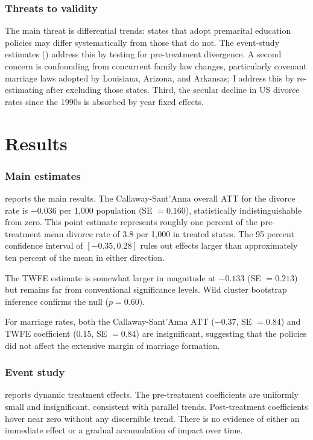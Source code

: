 \documentclass[12pt]{article}
\begin{document}
\subsubsection*{Threats to validity} The main threat is differential trends: states that adopt premarital education policies may differ systematically from those that do not. The event-study estimates () address this by testing for pre-treatment divergence. A second concern is confounding from concurrent family law changes, particularly covenant marriage laws adopted by Louisiana, Arizona, and Arkansas; I address this by re-estimating after excluding those states. Third, the secular decline in US divorce rates since the 1990s \citep{stevenson2007trends} is absorbed by year fixed effects.


\section{Results}
\label{sec:results}

\subsubsection*{Main estimates}  reports the main results. The Callaway-Sant'Anna overall ATT for the divorce rate is $-0.036$ per 1,000 population (SE $= 0.160$), statistically indistinguishable from zero. This point estimate represents roughly one percent of the pre-treatment mean divorce rate of 3.8 per 1,000 in treated states. The 95 percent confidence interval of $[-0.35, 0.28]$ rules out effects larger than approximately ten percent of the mean in either direction.

The TWFE estimate is somewhat larger in magnitude at $-0.133$ (SE $= 0.213$) but remains far from conventional significance levels. Wild cluster bootstrap inference confirms the null ($p = 0.60$).

For marriage rates, both the Callaway-Sant'Anna ATT ($-0.37$, SE $= 0.84$) and TWFE coefficient ($0.15$, SE $= 0.84$) are insignificant, suggesting that the policies did not affect the extensive margin of marriage formation.



\subsubsection*{Event study}  reports dynamic treatment effects. The pre-treatment coefficients are uniformly small and insignificant, consistent with parallel trends. Post-treatment coefficients hover near zero without any discernible trend. There is no evidence of either an immediate effect or a gradual accumulation of impact over time.
\end{document}
